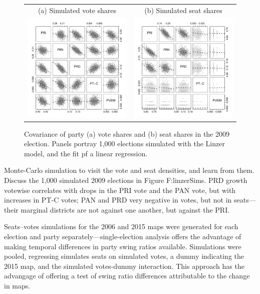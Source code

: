 \documentclass[letter,12pt]{article}
\begin{document}
\begin{figure}
\begin{center}
  \begin{tabular}{cc}
    (a) Simulated vote shares & (b) Simulated seat shares \\
    \includegraphics[width=.45\columnwidth]{linzerVoteSims2009.pdf} &
    \includegraphics[width=.45\columnwidth]{linzerSeatSims2009.pdf} 
  \end{tabular}
  \caption{Covariance of party (a) vote shares and (b) seat shares in the 2009 election. Panels portray 1,000 elections simulated with the Linzer model, and the fit pf a linear regression.}\label{F:linzerSims}
\end{center}
\end{figure}

Monte-Carlo simulation to visit the vote and seat densities, and learn from them. Discuss the 1,000 simulated 2009 elections in Figure {F:linzerSims}. PRD growth votewise correlates with drops in the PRI vote and the PAN vote, but with increases in PT-C votes; PAN and PRD very negative in votes, but not in seats---their marginal districts are not against one another, but against the PRI. 

Seats--votes simulations for the 2006 and 2015 maps were generated for each election and party separately---single-election analysis offers the advantage of making temporal differences in party swing ratios available. Simulations were pooled, regressing simulates seats on simulated votes, a dummy indicating the 2015 map, and the simulated votes-dummy interaction. This approach has the advangage of offering a test of swing ratio differences attributable to the change in maps. 
\end{document}
